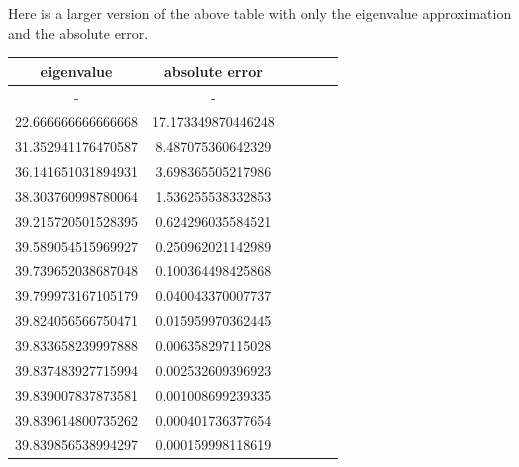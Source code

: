 \documentclass[11pt]{article}
\begin{document}
\begin{exercise}{1}
{\begin{enumerate}[label=\alph*)]
{            }
            Here is a larger version of the above table with only the eigenvalue approximation and the absolute error.
            \begin{center}
                \begin{tabular}{|c|c|c|c|c|c|}
                    \hline
                    eigenvalue & absolute error \\ \hline
                    - &                  - \\ \hline
                    22.666666666666668  &  17.173349870446248 \\ \hline
                    31.352941176470587  & 8.487075360642329 \\ \hline
                    36.141651031894931  & 3.698365505217986 \\ \hline
                    38.303760998780064  & 1.536255538332853 \\ \hline
                    39.215720501528395  & 0.624296035584521 \\ \hline
                    39.589054515969927  & 0.250962021142989 \\ \hline
                    39.739652038687048  & 0.100364498425868 \\ \hline
                    39.799973167105179  & 0.040043370007737 \\ \hline
                    39.824056566750471  & 0.015959970362445 \\ \hline
                    39.833658239997888  & 0.006358297115028 \\ \hline
                    39.837483927715994  & 0.002532609396923 \\ \hline
                    39.839007837873581  & 0.001008699239335 \\ \hline
                    39.839614800735262  & 0.000401736377654 \\ \hline
                    39.839856538994297  & 0.000159998118619 \\ \hline
                \end{tabular}
            \end{center}
        \end{enumerate}
    }
\end{exercise}
\end{document}
